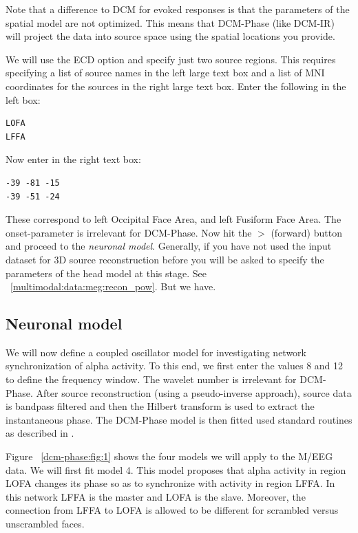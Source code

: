 Note that a difference to DCM for evoked responses is that the parameters of the spatial model are not optimized. This means that DCM-Phase (like DCM-IR) will project the data into source space using the spatial locations you provide.

We will use the ECD option and specify just two source regions. This requires specifying a list of source names in the left large text box and a list of MNI coordinates for the sources in the right large text box. Enter the following in the left box:

\begin{verbatim}
LOFA
LFFA
\end{verbatim}

Now enter in the right text box:

\begin{verbatim}
-39 -81 -15
-39 -51 -24
\end{verbatim}

These correspond to left Occipital Face Area, and left Fusiform Face Area.
The onset-parameter is irrelevant for DCM-Phase. Now hit the $>$ (forward) button and proceed to the \textit{neuronal model}. Generally, if you have not used the input dataset for 3D source reconstruction before you will be asked to specify the parameters of the head model at this stage. See ~\ref{multimodal:data:meg:recon_pow}. But we have.

\subsection{Neuronal model}

We will now define a coupled oscillator model for investigating network synchronization of alpha activity. To this end, we first enter the values 8 and 12 to define the frequency window. The wavelet number is irrelevant for DCM-Phase. After source reconstruction (using a pseudo-inverse approach), source data is bandpass filtered and then the Hilbert transform is used to extract the instantaneous phase. The DCM-Phase model is then fitted used standard routines as described in \cite{dcm_phase}.

Figure ~\ref{dcm-phase:fig:1} shows the four models we will apply to the 
M/EEG data. We will first fit model 4. This model proposes that alpha activity in region LOFA changes its phase so as to synchronize with activity in region LFFA. In this network LFFA is the master and LOFA is the slave. Moreover, the 
connection from LFFA to LOFA is allowed to be different for scrambled versus unscrambled faces.

